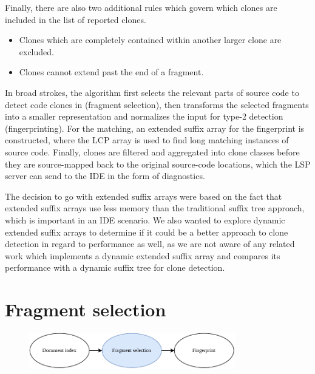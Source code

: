 Finally, there are also two additional rules which govern which clones are included in the
list of reported clones.

\begin{itemize}
    \item Clones which are completely contained within another larger clone are excluded.
    \item Clones cannot extend past the end of a fragment.
\end{itemize}

In broad strokes, the algorithm first selects the relevant parts of source code to detect
code clones in (fragment selection), then transforms the selected fragments into a smaller
representation and normalizes the input for type-2 detection (fingerprinting). For the
matching, an extended suffix array for the fingerprint is constructed, where the LCP array
is used to find long matching instances of source code. Finally, clones are filtered and
aggregated into clone classes before they are source-mapped back to the original
source-code locations, which the LSP server can send to the IDE in the form of
diagnostics.

The decision to go with extended suffix arrays were based on the fact that extended suffix
arrays use less memory than the traditional suffix tree approach, which is important in an
IDE scenario. We also wanted to explore dynamic extended suffix arrays to determine if it
could be a better approach to clone detection in regard to performance as well, as we are
not aware of any related work which implements a dynamic extended suffix array and
compares its performance with a dynamic suffix tree for clone detection.

\section{Fragment selection}

\begin{figure}[H]
    \begin{center}
        \includegraphics[width=0.8\textwidth]{figures/phases/phases_fragmentselection.drawio.pdf}
    \end{center}
\end{figure}

